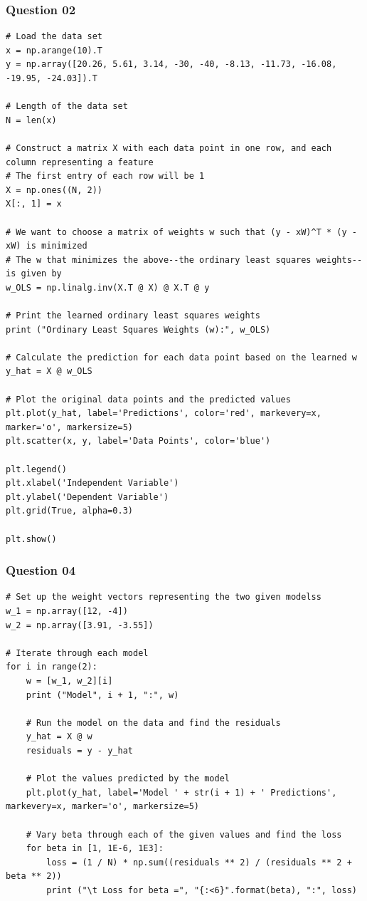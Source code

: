 \documentclass{article}[a4paper]
\begin{document}
	\subsubsection{Question 02}
	\begin{lstlisting}[label={q1_2_code}, caption={Ordinary Least Squares Regression and Plots}]
# Load the data set
x = np.arange(10).T
y = np.array([20.26, 5.61, 3.14, -30, -40, -8.13, -11.73, -16.08, -19.95, -24.03]).T

# Length of the data set
N = len(x)

# Construct a matrix X with each data point in one row, and each column representing a feature
# The first entry of each row will be 1
X = np.ones((N, 2))
X[:, 1] = x

# We want to choose a matrix of weights w such that (y - xW)^T * (y - xW) is minimized
# The w that minimizes the above--the ordinary least squares weights--is given by
w_OLS = np.linalg.inv(X.T @ X) @ X.T @ y

# Print the learned ordinary least squares weights
print ("Ordinary Least Squares Weights (w):", w_OLS)

# Calculate the prediction for each data point based on the learned w
y_hat = X @ w_OLS

# Plot the original data points and the predicted values
plt.plot(y_hat, label='Predictions', color='red', markevery=x, marker='o', markersize=5)
plt.scatter(x, y, label='Data Points', color='blue')

plt.legend()
plt.xlabel('Independent Variable')
plt.ylabel('Dependent Variable')
plt.grid(True, alpha=0.3)

plt.show()
	\end{lstlisting}

	\subsubsection{Question 04}
	\begin{lstlisting}[label={q1_4_code}, caption={Loss Calculation for Different Models and Values of $\beta$}]
# Set up the weight vectors representing the two given modelss
w_1 = np.array([12, -4])
w_2 = np.array([3.91, -3.55])

# Iterate through each model
for i in range(2):
    w = [w_1, w_2][i]
    print ("Model", i + 1, ":", w)

    # Run the model on the data and find the residuals
    y_hat = X @ w
    residuals = y - y_hat

    # Plot the values predicted by the model
    plt.plot(y_hat, label='Model ' + str(i + 1) + ' Predictions', markevery=x, marker='o', markersize=5)

    # Vary beta through each of the given values and find the loss
    for beta in [1, 1E-6, 1E3]:
        loss = (1 / N) * np.sum((residuals ** 2) / (residuals ** 2 + beta ** 2))
        print ("\t Loss for beta =", "{:<6}".format(beta), ":", loss)
	\end{lstlisting}
\end{document}

